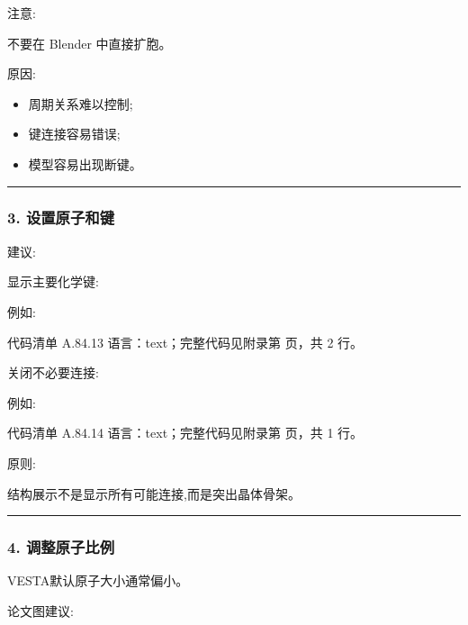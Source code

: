\documentclass[lang=cn,scheme=chinese,color=blue,device=normal,toc=onecol,math=cm]{elegantbook}
\begin{document}
注意:\par


不要在 Blender 中直接扩胞。\par


原因:\par


\begin{itemize}
\item 周期关系难以控制;
\item 键连接容易错误;
\item 模型容易出现断键。
\end{itemize}


\medskip\hrule\medskip


\subsubsection{3. 设置原子和键}


建议:\par


显示主要化学键:\par


例如:\par


\begin{codeindexbox}{代码清单 A.84.13}
语言：text；完整代码见附录第 \pageref{code:84:13} 页，共 2 行。
\end{codeindexbox}


关闭不必要连接:\par


例如:\par


\begin{codeindexbox}{代码清单 A.84.14}
语言：text；完整代码见附录第 \pageref{code:84:14} 页，共 1 行。
\end{codeindexbox}


原则:\par


结构展示不是显示所有可能连接,而是突出晶体骨架。\par


\medskip\hrule\medskip


\subsubsection{4. 调整原子比例}


VESTA默认原子大小通常偏小。\par


论文图建议:\par
\end{document}
